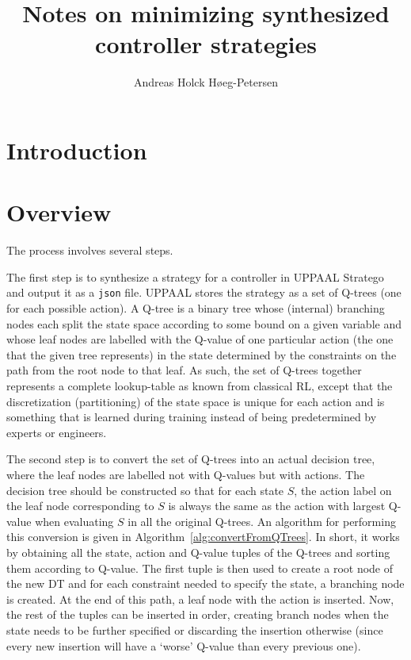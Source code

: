 \documentclass{article}
\title{Notes on minimizing synthesized controller strategies}
\author{Andreas Holck Høeg-Petersen}
\begin{document}
\maketitle

\section{Introduction}%
\label{sec:intro}

\lipsum[1]

\section{Overview}%
\label{sec:overview}

The process involves several steps.

The first step is to synthesize a strategy for a controller in UPPAAL Stratego
and output it as a \texttt{json} file. UPPAAL stores the strategy as a set of
Q-trees (one for each possible action). A Q-tree is a binary tree whose
(internal) branching nodes each split the state space according to some bound on
a given variable and whose leaf nodes are labelled with the Q-value of one
particular action (the one that the given tree represents) in the state
determined by the constraints on the path from the root node to that leaf. As
such, the set of Q-trees together represents a complete lookup-table as known
from classical RL, except that the discretization (partitioning) of the state
space is unique for each action and is something that is learned during training
instead of being predetermined by experts or engineers.

The second step is to convert the set of Q-trees into an actual decision tree,
where the leaf nodes are labelled not with Q-values but with actions. The
decision tree should be constructed so that for each state $S$, the action label
on the leaf node corresponding to $S$ is always the same as the action with
largest Q-value when evaluating $S$ in all the original Q-trees. An algorithm
for performing this conversion is given in
Algorithm~\ref{alg:convertFromQTrees}. In short, it works by obtaining all the
state, action and Q-value tuples of the Q-trees and sorting them according to
Q-value. The first tuple is then used to create a root node of the new DT and
for each constraint needed to specify the state, a branching node is created. At
the end of this path, a leaf node with the action is inserted. Now, the rest of
the tuples can be inserted in order, creating branch nodes when the state needs
to be further specified or discarding the insertion otherwise (since every new
insertion will have a `worse' Q-value than every previous one).
\end{document}
